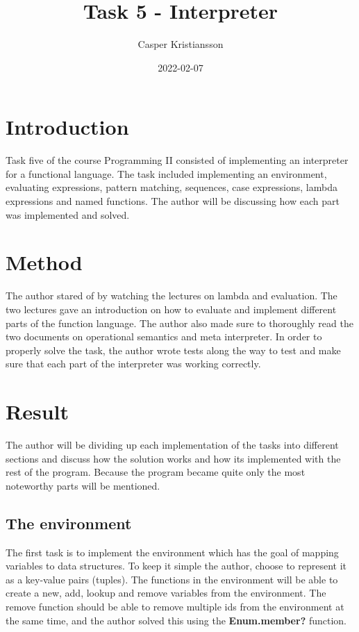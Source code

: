 \documentclass[a4paper,11pt]{article}
\begin{document}
\title{
    \textbf{Task 5 - Interpreter}
}
\author{Casper Kristiansson}
\date{2022-02-07}

\maketitle

\section*{Introduction}
Task five of the course Programming II consisted of implementing an interpreter for a functional language. The task included implementing an environment, evaluating expressions, pattern matching, sequences, case expressions, lambda expressions and named functions. The author will be discussing how each part was implemented and solved.

\section*{Method}
The author stared of by watching the lectures on lambda and evaluation. The two lectures gave an introduction on how to evaluate and implement different parts of the function language. The author also made sure to thoroughly read the two documents on operational semantics and meta interpreter. In order to properly solve the task, the author wrote tests along the way to test and make sure that each part of the interpreter was working correctly.

\section*{Result}
The author will be dividing up each implementation of the tasks into different sections and discuss how the solution works and how its implemented with the rest of the program. Because the program became quite only the most noteworthy parts will be mentioned.

\subsection*{The environment}
The first task is to implement the environment which has the goal of mapping variables to data structures. To keep it simple the author, choose to represent it as a key-value pairs (tuples). The functions in the environment will be able to create a new, add, lookup and remove variables from the environment. The remove function should be able to remove multiple ids from the environment at the same time, and the author solved this using the \textbf{Enum.member?} function.
\end{document}
